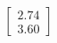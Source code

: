 \documentclass[preview]{standalone}
\begin{document}
\begin{align*}
\begin{bmatrix} 2.74 \\ 3.60 \end{bmatrix}
\end{align*}
\end{document}
